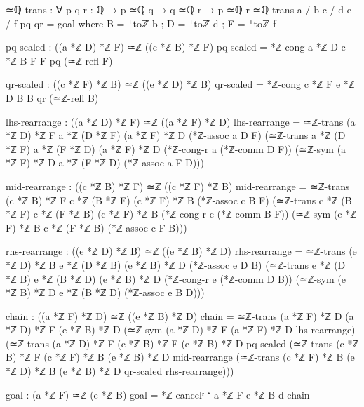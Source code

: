 \documentclass[11pt,a4paper]{book}
\begin{document}
\begin{code}
≃ℚ-trans : ∀ {p q r : ℚ} → p ≃ℚ q → q ≃ℚ r → p ≃ℚ r
≃ℚ-trans {a / b} {c / d} {e / f} pq qr = goal
  where
    B = ⁺toℤ b ; D = ⁺toℤ d ; F = ⁺toℤ f
    
    pq-scaled : ((a *ℤ D) *ℤ F) ≃ℤ ((c *ℤ B) *ℤ F)
    pq-scaled = *ℤ-cong {a *ℤ D} {c *ℤ B} {F} {F} pq (≃ℤ-refl F)
    
    qr-scaled : ((c *ℤ F) *ℤ B) ≃ℤ ((e *ℤ D) *ℤ B)
    qr-scaled = *ℤ-cong {c *ℤ F} {e *ℤ D} {B} {B} qr (≃ℤ-refl B)
    
    lhs-rearrange : ((a *ℤ D) *ℤ F) ≃ℤ ((a *ℤ F) *ℤ D)
    lhs-rearrange = ≃ℤ-trans {(a *ℤ D) *ℤ F} {a *ℤ (D *ℤ F)} {(a *ℤ F) *ℤ D}
                     (*ℤ-assoc a D F)
                     (≃ℤ-trans {a *ℤ (D *ℤ F)} {a *ℤ (F *ℤ D)} {(a *ℤ F) *ℤ D}
                       (*ℤ-cong-r a (*ℤ-comm D F))
                       (≃ℤ-sym {(a *ℤ F) *ℤ D} {a *ℤ (F *ℤ D)} (*ℤ-assoc a F D)))
    
    mid-rearrange : ((c *ℤ B) *ℤ F) ≃ℤ ((c *ℤ F) *ℤ B)
    mid-rearrange = ≃ℤ-trans {(c *ℤ B) *ℤ F} {c *ℤ (B *ℤ F)} {(c *ℤ F) *ℤ B}
                     (*ℤ-assoc c B F)
                     (≃ℤ-trans {c *ℤ (B *ℤ F)} {c *ℤ (F *ℤ B)} {(c *ℤ F) *ℤ B}
                       (*ℤ-cong-r c (*ℤ-comm B F))
                       (≃ℤ-sym {(c *ℤ F) *ℤ B} {c *ℤ (F *ℤ B)} (*ℤ-assoc c F B)))
    
    rhs-rearrange : ((e *ℤ D) *ℤ B) ≃ℤ ((e *ℤ B) *ℤ D)
    rhs-rearrange = ≃ℤ-trans {(e *ℤ D) *ℤ B} {e *ℤ (D *ℤ B)} {(e *ℤ B) *ℤ D}
                     (*ℤ-assoc e D B)
                     (≃ℤ-trans {e *ℤ (D *ℤ B)} {e *ℤ (B *ℤ D)} {(e *ℤ B) *ℤ D}
                       (*ℤ-cong-r e (*ℤ-comm D B))
                       (≃ℤ-sym {(e *ℤ B) *ℤ D} {e *ℤ (B *ℤ D)} (*ℤ-assoc e B D)))
    
    chain : ((a *ℤ F) *ℤ D) ≃ℤ ((e *ℤ B) *ℤ D)
    chain = ≃ℤ-trans {(a *ℤ F) *ℤ D} {(a *ℤ D) *ℤ F} {(e *ℤ B) *ℤ D}
              (≃ℤ-sym {(a *ℤ D) *ℤ F} {(a *ℤ F) *ℤ D} lhs-rearrange)
              (≃ℤ-trans {(a *ℤ D) *ℤ F} {(c *ℤ B) *ℤ F} {(e *ℤ B) *ℤ D}
                pq-scaled
                (≃ℤ-trans {(c *ℤ B) *ℤ F} {(c *ℤ F) *ℤ B} {(e *ℤ B) *ℤ D}
                  mid-rearrange
                  (≃ℤ-trans {(c *ℤ F) *ℤ B} {(e *ℤ D) *ℤ B} {(e *ℤ B) *ℤ D}
                    qr-scaled rhs-rearrange)))
    
    goal : (a *ℤ F) ≃ℤ (e *ℤ B)
    goal = *ℤ-cancelʳ-⁺ {a *ℤ F} {e *ℤ B} d chain
\end{code}
\end{document}
